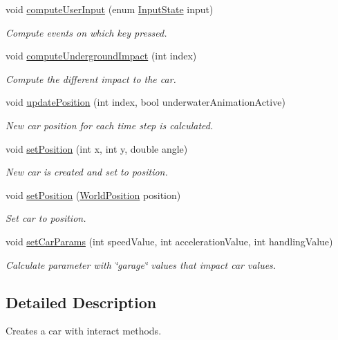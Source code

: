 \begin{DoxyCompactItemize}
void \mbox{\hyperlink{class_car_afda59d6973be7a6816edf035b688397a}{compute\+User\+Input}} (enum \mbox{\hyperlink{car_8h_aecfb003a08d29c0b75cd266ca0cadb76}{Input\+State}} input)
\begin{DoxyCompactList}\small\item\em Compute events on which key pressed. \end{DoxyCompactList}\item 
void \mbox{\hyperlink{class_car_aba9518903b2ae2d20891e5bd0ecb675d}{compute\+Underground\+Impact}} (int index)
\begin{DoxyCompactList}\small\item\em Compute the different impact to the car. \end{DoxyCompactList}\item 
void \mbox{\hyperlink{class_car_a19984606f16a1f3e5cc60dd498d49e21}{update\+Position}} (int index, bool underwater\+Animation\+Active)
\begin{DoxyCompactList}\small\item\em New car position for each time step is calculated. \end{DoxyCompactList}\item 
void \mbox{\hyperlink{class_car_a70ccf9704fc66841b15596e83fb42bd9}{set\+Position}} (int x, int y, double angle)
\begin{DoxyCompactList}\small\item\em New car is created and set to position. \end{DoxyCompactList}\item 
void \mbox{\hyperlink{class_car_a4bc925d78a3dc20a05e7116cab23295a}{set\+Position}} (\mbox{\hyperlink{class_world_position}{World\+Position}} position)
\begin{DoxyCompactList}\small\item\em Set car to position. \end{DoxyCompactList}\item 
void \mbox{\hyperlink{class_car_aa409659cb5303da3771bde8acce9fc07}{set\+Car\+Params}} (int speed\+Value, int acceleration\+Value, int handling\+Value)
\begin{DoxyCompactList}\small\item\em Calculate parameter with \char`\"{}garage\char`\"{} values that impact car values. \end{DoxyCompactList}\end{DoxyCompactItemize}


\subsection{Detailed Description}
Creates a car with interact methods. 

